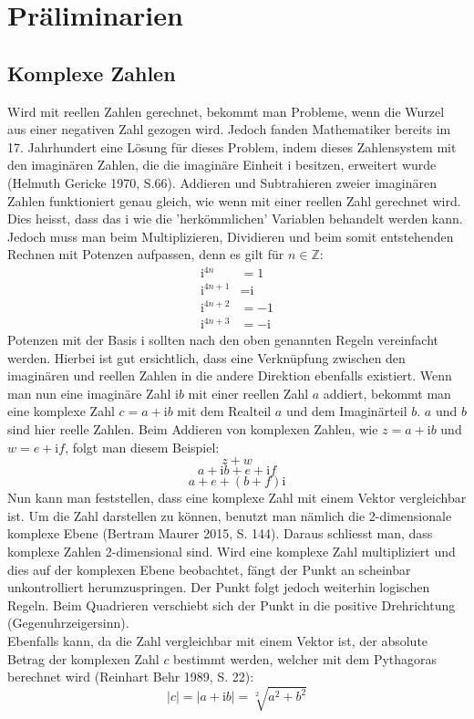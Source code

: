 \section{Präliminarien}
\subsection{Komplexe Zahlen}
Wird mit reellen Zahlen gerechnet, bekommt man Probleme, wenn die Wurzel aus einer negativen Zahl gezogen wird. Jedoch fanden Mathematiker bereits im 17. Jahrhundert eine Lösung für dieses Problem, indem dieses Zahlensystem mit den imaginären Zahlen, die die imaginäre Einheit i besitzen, erweitert wurde (Helmuth Gericke 1970, S.66). Addieren und Subtrahieren zweier imaginären Zahlen funktioniert genau gleich, wie wenn mit einer reellen Zahl gerechnet wird. Dies heisst, dass das i wie die 'herkömmlichen' Variablen behandelt werden kann. Jedoch muss man beim Multiplizieren, Dividieren und beim somit entstehenden Rechnen mit Potenzen aufpassen, denn es gilt für $n \in \mathbb{Z}$:
\begin{align*}
\text{i}^{4n} &= 1 \\
\text{i}^{4n+1} &= \text{i} \\
\text{i}^{4n+2} &= -1 \\
\text{i}^{4n+3} &= -\text{i}
\end{align*}
Potenzen mit der Basis i sollten nach den oben genannten Regeln vereinfacht werden. Hierbei ist gut ersichtlich, dass eine Verknüpfung zwischen den imaginären und reellen Zahlen in die andere Direktion ebenfalls existiert. Wenn man nun eine imaginäre Zahl $\text{i}b$ mit einer reellen Zahl $a$ addiert, bekommt man eine komplexe Zahl  $c=a+\text{i}b$ mit dem Realteil $a$ und dem Imaginärteil $b$. $a$ und $b$ sind hier reelle Zahlen. Beim Addieren von komplexen Zahlen, wie $z=a+\text{i}b$ und $w=e+\text{i}f$, folgt man diesem Beispiel:
\[z+w\]
\[a+\text{i}b+e+\text{i}f\]
\[a+e+(b+f)\text{i}\]
Nun kann man feststellen, dass eine komplexe Zahl mit einem Vektor vergleichbar ist. Um die Zahl darstellen zu können, benutzt man nämlich die 2-dimensionale komplexe Ebene (Bertram Maurer 2015, S. 144). Daraus schliesst man, dass komplexe Zahlen 2-dimensional sind. Wird eine komplexe Zahl multipliziert und dies auf der komplexen Ebene beobachtet, fängt der Punkt an scheinbar unkontrolliert herumzuspringen. Der Punkt folgt jedoch weiterhin logischen Regeln. Beim Quadrieren verschiebt sich der Punkt in die positive Drehrichtung (Gegenuhrzeigersinn).
\\
Ebenfalls kann, da die Zahl vergleichbar mit einem Vektor ist, der absolute Betrag der komplexen Zahl $c$ bestimmt werden, welcher mit dem Pythagoras berechnet wird (Reinhart Behr 1989, S. 22):
\[|c| = |a+\text{i}b| = \sqrt[2]{a^2+b^2}\]

